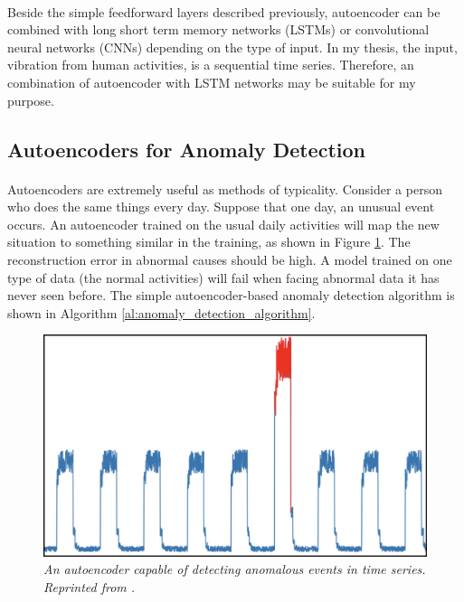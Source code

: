 \paragraph{}
Beside the simple feedforward layers described previously, autoencoder can be combined with long short term memory networks (LSTMs) or convolutional neural networks (CNNs) depending on the type of input. In my thesis, the input, vibration from human activities, is a sequential time series. Therefore, an combination of autoencoder with LSTM networks may be suitable for my purpose.

\subsection{Autoencoders for Anomaly Detection}

\paragraph{}
Autoencoders are extremely useful as methods of typicality. Consider a person who does the same things every day. Suppose that one day, an unusual event occurs. An autoencoder trained on the usual daily activities will map the new situation to something similar in the training, as shown in Figure \ref{fig:ae_detection}. The reconstruction error in abnormal causes should be high. A model trained on one type of data (the normal activities) will fail when facing abnormal data it has never seen before. The simple autoencoder-based anomaly detection algorithm is shown in Algorithm \ref{al:anomaly_detection_algorithm}.

\begin{figure}[H]
  \centering
  \caption[An autoencoder capable of detecting anomalous events in time series.]{\emph{An autoencoder capable of detecting anomalous events in time series. \\ Reprinted from \citeauthor{pavithrasv_2020} \citeyear{pavithrasv_2020}.}}\label{fig:ae_detection}
  \includegraphics[scale = 0.2]{figures/ae_detection.jpg}  
\end{figure}

